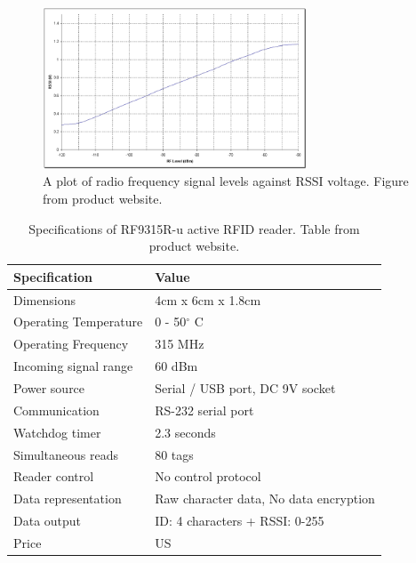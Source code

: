 \begin{figure}[h]
	\begin{center}
		\includegraphics[width=0.7\textwidth]{figures/rssi}
		\caption{A plot of radio frequency signal levels against RSSI voltage. Figure from product website\protect\footnotemark[2].}
		\label{fig:rssi}
	\end{center}
\end{figure}

\begin{table}[h]
	\centering
	\begin{tabular}{ | m{4cm} || m{7cm} | }
		\hline
		\textbf{Specification}	& \textbf{Value} \\ \hline
		Dimensions				& 4cm x 6cm x 1.8cm \\ \hline
		Operating Temperature	& 0 - 50$^\circ$ C	\\ \hline
		Operating Frequency		& 315 MHz	\\ \hline
		Incoming signal range	& 60 dBm \\ \hline
		Power source			& Serial / USB port, DC 9V socket \\ \hline
		Communication			& RS-232 serial port \\ \hline
		Watchdog timer			& 2.3 seconds \\ \hline
		Simultaneous reads		& 80 tags	\\ \hline
		Reader control			& No control protocol \\ \hline
		Data representation		& Raw character data, No data encryption	\\ \hline
		Data output				& ID: 4 characters + RSSI: 0-255 \\ \hline
		Price					& US \textdollar 49.95 \\ \hline
	\end{tabular}
	\caption{Specifications of RF9315R-u active RFID reader. Table from product website\protect\footnotemark.}
	\label{tbl:reader}
\end{table}


